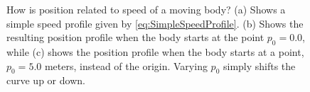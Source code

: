 \begin{figure}[htb]%
\centering
{}%
\hspace{5pt}%
\centering
{}%
\centering
{}%
    \caption[]{How is position related to speed of a moving body? (a) Shows a simple speed profile given by \eqref{eq:SimpleSpeedProfile}. (b) Shows the resulting position profile when the body starts at the point $p_0 =0.0$, while (c) shows the position profile when the body starts at a point, $p_0 =5.0$ meters, instead of the origin. Varying $p_0$ simply shifts the curve up or down.}
    \label{fig:SimpleSpeedPositionProfiles}
\end{figure}

